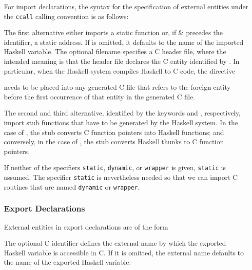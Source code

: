 \documentclass[a4paper,twoside]{article}
\newcommand{\code}[1]{\texttt{#1}}      %
\begin{document}
For import declarations, the syntax for the specification of external entities
under the \code{ccall} calling convention is as follows:
%
\begin{grammar}
\end{grammar}
%
The first alternative either imports a static function  or, if
\gterm\& precedes the identifier, a static address.  If  is
omitted, it defaults to the name of the imported Haskell variable.  The
optional filename  specifies a C header file, where the
intended meaning is that the header file declares the C entity identified by
.  In particular, when the Haskell system compiles Haskell to C
code, the directive
%
\begin{quote}
\end{quote}
%
needs to be placed into any generated C file that refers to the foreign entity
before the first occurrence of that entity in the generated C file.

The second and third alternative, identified by the keywords 
and , respectively, import stub functions that have to be
generated by the Haskell system.  In the case of , the stub
converts C function pointers into Haskell functions; and conversely, in the
case of , the stub converts Haskell thunks to C function
pointers.

If neither of the specifiers \code{static}, \code{dynamic}, or \code{wrapper}
is given, \code{static} is assumed.  The specifier \code{static} is
nevertheless needed so that we can import C routines that are named
\code{dynamic} or \code{wrapper}.

\subsubsection{Export Declarations}

External entities in  export declarations are of the form
%
\begin{grammar}
\end{grammar}
%
The optional C identifier  defines the external name by which the
exported Haskell variable is accessible in C.  If it is omitted, the external
name defaults to the name of the exported Haskell variable.
\end{document}
